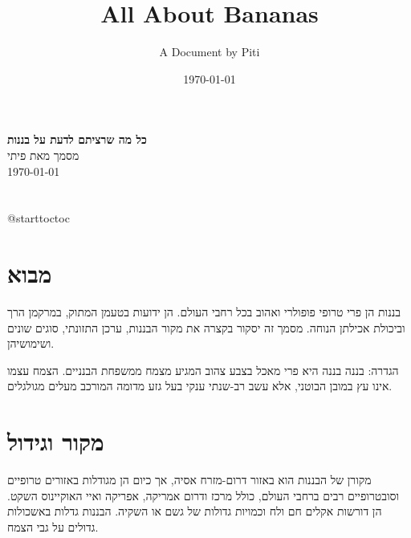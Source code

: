\documentclass[12pt]{article}
\makeatletter
\renewcommand\tableofcontents{\section*{\contentsname}
    @starttoc{toc}}
\makeatother
\begin{document}
\begin{otherlanguage}{english}
\title{All About Bananas} %
\author{A Document by Piti}
\date{\today}
\end{otherlanguage}

\begin{center}
{\Large\bfseries\hebrewfont כל מה שרציתם לדעת על בננות} \\
\vspace{1em}
\normalsize\hebrewfont מסמך מאת פיתי \\
\vspace{0.5em}
\normalsize\hebrewfont \today
\end{center}

\vfill %

\tableofcontents %

\vfill %

\newpage %

\section*{מבוא}

בננות הן פרי טרופי פופולרי ואהוב בכל רחבי העולם. הן ידועות בטעמן המתוק, במרקמן הרך וביכולת אכילתן הנוחה. מסמך זה יסקור בקצרה את מקור הבננות, ערכן התזונתי, סוגים שונים ושימושיהן.

\begin{definitionBox}{הגדרה: בננה}
בננה היא פרי מאכל בצבע צהוב המגיע מצמח ממשפחת הבנניים. הצמח עצמו אינו עץ במובן הבוטני, אלא עשב רב-שנתי ענקי בעל גזע מדומה המורכב מעלים מגולגלים.
\end{definitionBox}

\section{מקור וגידול}

מקורן של הבננות הוא באזור דרום-מזרח אסיה, אך כיום הן מגודלות באזורים טרופיים וסובטרופיים רבים ברחבי העולם, כולל מרכז ודרום אמריקה, אפריקה ואיי האוקיינוס השקט. הן דורשות אקלים חם ולח וכמויות גדולות של גשם או השקיה. הבננות גדלות באשכולות גדולים על גבי הצמח.
\end{document}
